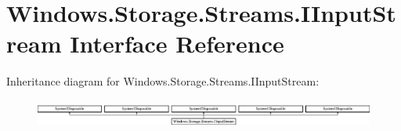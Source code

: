 \hypertarget{interface_windows_1_1_storage_1_1_streams_1_1_i_input_stream}{}\section{Windows.\+Storage.\+Streams.\+I\+Input\+Stream Interface Reference}
\label{interface_windows_1_1_storage_1_1_streams_1_1_i_input_stream}
Inheritance diagram for Windows.\+Storage.\+Streams.\+I\+Input\+Stream\+:\begin{figure}[H]
\begin{center}
\leavevmode
\includegraphics[height=0.933333cm]{interface_windows_1_1_storage_1_1_streams_1_1_i_input_stream}
\end{center}
\end{figure}
